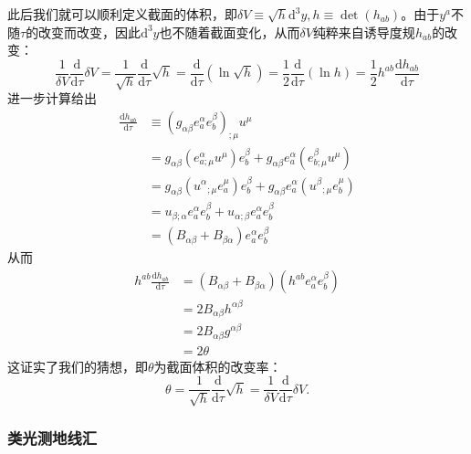 \documentclass[hyperref, UTF8, a4paper]{ctexart}
\begin{document}
此后我们就可以顺利定义截面的体积，即$\delta V\equiv \sqrt{h}\mathrm{d}^{3} y,h\equiv \det( h_{ab})$。由于$y^{a}$不随$\tau $的改变而改变，因此$\mathrm{d}^{3} y$也不随着截面变化，从而$\delta V$纯粹来自诱导度规$h_{ab}$的改变：
\begin{equation*}
	\frac{1}{\delta V}\frac{\mathrm{d}}{\mathrm{d} \tau } \delta V=\frac{1}{\sqrt{h}}\frac{\mathrm{d}}{\mathrm{d} \tau }\sqrt{h} =\frac{\mathrm{d}}{\mathrm{d} \tau }\left(\ln\sqrt{h}\right) =\frac{1}{2}\frac{\mathrm{d}}{\mathrm{d} \tau }(\ln h) =\frac{1}{2} h^{ab}\frac{\mathrm{d} h_{ab}}{\mathrm{d} \tau }
\end{equation*}
进一步计算给出
\begin{equation*}
	\begin{aligned}
		\frac{\mathrm{d} h_{ab}}{\mathrm{d} \tau } & \equiv \left( g_{\alpha \beta } e_{a}^{\alpha } e_{b}^{\beta }\right)_{;\mu } u^{\mu }\\
		& =g_{\alpha \beta }\left( e_{a;\mu }^{\alpha } u^{\mu }\right) e_{b}^{\beta } +g_{\alpha \beta } e_{a}^{\alpha }\left( e_{b;\mu }^{\beta } u^{\mu }\right)\\
		& =g_{\alpha \beta }\left( u^{\alpha }{}_{;\mu } e_{a}^{\mu }\right) e_{b}^{\beta } +g_{\alpha \beta } e_{a}^{\alpha }\left( u^{\beta }{}_{;\mu } e_{b}^{\mu }\right)\\
		& =u_{\beta ;\alpha } e_{a}^{\alpha } e_{b}^{\beta } +u_{\alpha ;\beta } e_{a}^{\alpha } e_{b}^{\beta }\\
		& =( B_{\alpha \beta } +B_{\beta \alpha }) e_{a}^{\alpha } e_{b}^{\beta }
	\end{aligned}
\end{equation*}
从而
\begin{equation*}
	\begin{aligned}
		h^{ab}\frac{\mathrm{d} h_{ab}}{\mathrm{d} \tau } & =( B_{\alpha \beta } +B_{\beta \alpha })\left( h^{ab} e_{a}^{\alpha } e_{b}^{\beta }\right)\\
		& =2B_{\alpha \beta } h^{\alpha \beta }\\
		& =2B_{\alpha \beta } g^{\alpha \beta }\\
		& =2\theta 
	\end{aligned}
\end{equation*}
这证实了我们的猜想，即$\theta $为截面体积的改变率：
\begin{equation*}
	\theta =\frac{1}{\sqrt{h}}\frac{\mathrm{d}}{\mathrm{d} \tau }\sqrt{h} =\frac{1}{\delta V}\frac{\mathrm{d}}{\mathrm{d} \tau } \delta V.
\end{equation*}
\subsubsection{类光测地线汇}
\end{document}

